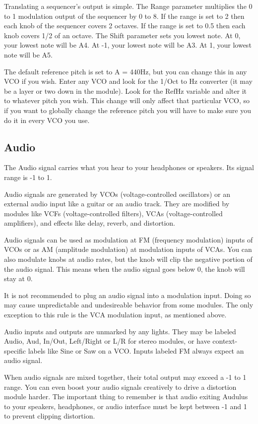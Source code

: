 \documentclass[11pt]{book}
\begin{document}
Translating a sequencer's output is simple. The Range parameter multiplies the 0 to 1 modulation output of the sequencer by 0 to 8. If the range is set to 2 then each knob of the sequencer covers 2 octaves. If the range is set to 0.5 then each knob covers 1/2 of an octave. The Shift parameter sets you lowest note. At 0, your lowest note will be A4. At -1, your lowest note will be A3. At 1, your lowest note will be A5.

The default reference pitch is set to A = 440Hz, but you can change this in any VCO if you wish. Enter any VCO and look for the 1/Oct to Hz converter (it may be a layer or two down in the module). Look for the RefHz variable and alter it to whatever pitch you wish. This change will only affect that particular VCO, so if you want to globally change the reference pitch you will have to make sure you do it in every VCO you use.

\subsection{Audio}

The Audio signal carries what you hear to your headphones or speakers. Its signal range is -1 to 1.

Audio signals are generated by VCOs (voltage-controlled oscillators) or an external audio input like a guitar or an audio track. They are modified by modules like VCFs (voltage-controlled filters), VCAs (voltage-controlled amplifiers), and effects like delay, reverb, and distortion.

Audio signals can be used as modulation at FM (frequency modulation) inputs of VCOs or as AM (amplitude modulation) at modulation inputs of VCAs. You can also modulate knobs at audio rates, but the knob will clip the negative portion of the audio signal. This means when the audio signal goes below 0, the knob will stay at 0. 

It is not recommended to plug an audio signal into a modulation input. Doing so may cause unpredictable and undesireable behavior from some modules. The only exception to this rule is the VCA modulation input, as mentioned above.

Audio inputs and outputs are unmarked by any lights. They may be labeled Audio, Aud, In/Out, Left/Right or L/R for stereo modules, or have context-specific labels like Sine or Saw on a VCO. Inputs labeled FM always expect an audio signal.

When audio signals are mixed together, their total output may exceed a -1 to 1 range. You can even boost your audio signals creatively to drive a distortion module harder. The important thing to remember is that audio exiting Audulus to your speakers, headphones, or audio interface must be kept between -1 and 1 to prevent clipping distortion. 
\end{document}

